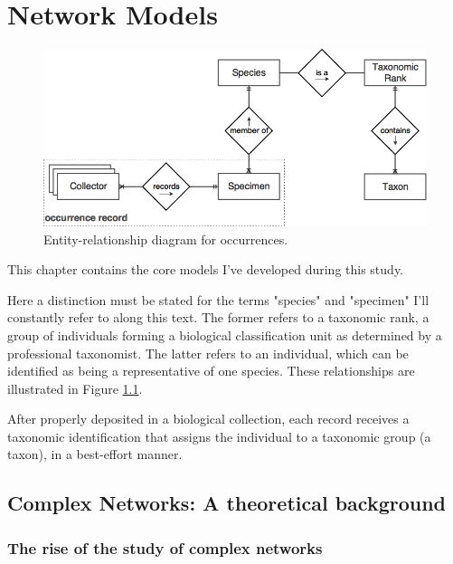 \chapter{Network Models}\label{network_models}




\begin{figure}[h!]
  	\centering
    \includegraphics[width=0.8\linewidth]{figures/er_occurrence.png}
    \caption{Entity-relationship diagram for occurrences.}
    \label{fig:er_occurrences}
\end{figure}

This chapter contains the core models I've developed during this study.

Here a distinction must be stated for the terms "species" and "specimen" I'll constantly refer to along this text. The former refers to a taxonomic rank, a group of individuals forming a biological classification unit as determined by a professional taxonomist. The latter refers to an individual, which can be identified as being a representative of one species. These relationships are illustrated in Figure \ref{fig:er_occurrences}.

After properly deposited in a biological collection, each record receives a taxonomic identification that assigns the individual to a taxonomic group (a taxon), in a best-effort manner.

\section{Complex Networks: A theoretical background}
\subsection{The rise of the study of complex networks}

